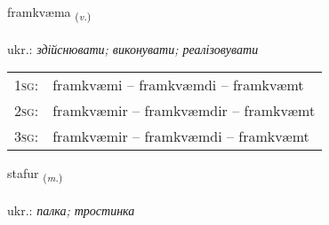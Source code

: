 \documentclass[frontgrid, backgrid]{flacards}\usepackage[]{graphicx}\usepackage[]{xcolor}
\begin{document}
\renewcommand{\flhead}{\vskip5pt \fboxsep=0pt {\small\bfseries\footnotesize Sagnorð | дієслово}}
\renewcommand{\fcfoot}{\vskip5pt \fboxsep=0pt \hspace{2pt}{\small\bfseries\footnotesize 2K}}

\renewcommand{\blhead}{\vskip5pt {\small\bfseries\footnotesize Sagnorð | дієслово }}
\renewcommand{\bcfoot}{\vskip5pt \hspace{2pt}{\small\bfseries\footnotesize 2K}}


{framkvæma \small{\textsubscript{(\textit{v.})}} \\[1ex] %
\textphonetic{[framkʰvaima]} \\
ukr.: \emph{здійснювати; виконувати; реалізовувати} \\  [2ex]
\renewcommand*{\arraystretch}{0.8}
\begin{tabular}{p{1cm}l}
\textsc{1sg}: & framkvæmi -- framkvæmdi -- framkvæmt \\ 
\textsc{2sg}: & framkvæmir -- framkvæmdir -- framkvæmt \\ 
\textsc{3sg}: & framkvæmir -- framkvæmdi -- framkvæmt \\ 
\end{tabular}
}

\renewcommand{\flhead}{\vskip5pt \fboxsep=0pt {\small\bfseries\footnotesize Nafnorð | іменник}}
\renewcommand{\fcfoot}{\vskip5pt \fboxsep=0pt \hspace{2pt}{\small\bfseries\footnotesize 2K}}

\renewcommand{\blhead}{\vskip5pt {\small\bfseries\footnotesize Nafnorð | іменник }}
\renewcommand{\bcfoot}{\vskip5pt \hspace{2pt}{\small\bfseries\footnotesize 2K}}


{stafur \small{\textsubscript{(\textit{m.})}} \\[1ex] %
\textphonetic{[staːvʏr]} \\
ukr.: \emph{палка; тростинка} \\  [2ex]
\renewcommand*{\arraystretch}{0.8}
}
\end{document}
